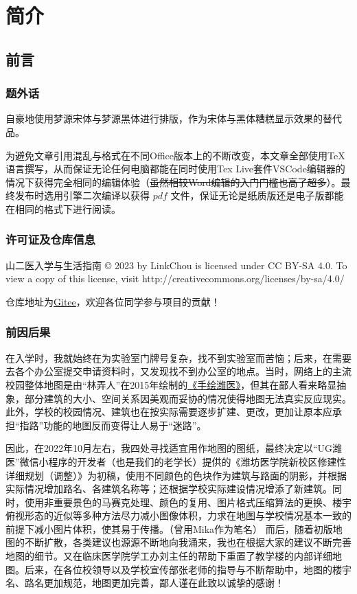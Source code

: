 \chapter[简介]{简介\vspace{-1.5em}}

\section[前言]{前言\vspace{-.5em}}
\subsection[题外话]{题外话}
自豪地使用梦源宋体与梦源黑体进行排版，作为宋体与黑体糟糕显示效果的替代品。

为避免文章引用混乱与格式在不同Office版本上的不断改变，本文章全部使用\TeX 语言撰写，从而保证无论任何电脑都能在同时使用Tex Live套件VSCode编辑器\footnotemark 的情况下获得完全相同的编辑体验（\sout{虽然相较Word编辑的入门门槛也高了超多}）。最终发布时选用\XeLaTeX 引擎二次编译以获得 $pdf$ 文件，保证无论是纸质版还是电子版都能在相同的格式下进行阅读。

\subsection[许可证及仓库信息]{许可证及仓库信息}
山二医入学与生活指南 © 2023 by LinkChou is licensed under CC BY-SA 4.0. To view a copy of this license, visit http://creativecommons.org/licenses/by-sa/4.0/

仓库地址为\uline{\href{https://gitee.com/mikazo/guide_for_freshman}{Gitee}}，欢迎各位同学参与项目的贡献！

\subsection[前因后果]{前因后果}
在入学时，我就始终在为实验室门牌号复杂，找不到实验室而苦恼；后来，在需要去各个办公室提交申请资料时，又发现找不到办公室的地点。当时，网络上的主流校园整体地图是由“林弄人”在2015年绘制的\uline{\href{https://www.zcool.com.cn/work/ZMTgxMDQwMjg=.html?}{《手绘潍医》}}，但其在鄙人看来略显抽象，部分建筑的大小、空间关系因美观而妥协的情况使得地图无法真实反应现实。
此外，学校的校园情况、建筑也在按实际需要逐步扩建、更改，更加让原本应承担“指路”功能的地图反而变得让人易于“迷路”。

因此，在2022年10月左右，我四处寻找适宜用作地图的图纸，最终决定以“UG潍医”微信小程序的开发者（也是我们的老学长）提供的《潍坊医学院新校区修建性详细规划（调整）》为初稿，使用不同颜色的色块作为建筑与路面的阴影，并根据实际情况增加路名、各建筑名称等；还根据学校实际建设情况增添了新建筑。同时，使用非重要景色的马赛克处理、颜色的复用、图片格式压缩算法的更换、楼宇俯视形态的近似等多种方法尽力减小图像体积，力求在地图与学校情况基本一致的前提下减小图片体积，使其易于传播。（曾用Mika作为笔名）
而后，随着初版地图的不断扩散，各类建议也源源不断地向我涌来，我也在根据大家的建议不断完善地图的细节。又在临床医学院学工办刘主任的帮助下重置了教学楼的内部详细地图。后来，在各位校领导以及学校宣传部张老师的指导与不断帮助中，地图的楼宇名、路名更加规范，地图更加完善，鄙人谨在此致以诚挚的感谢！

